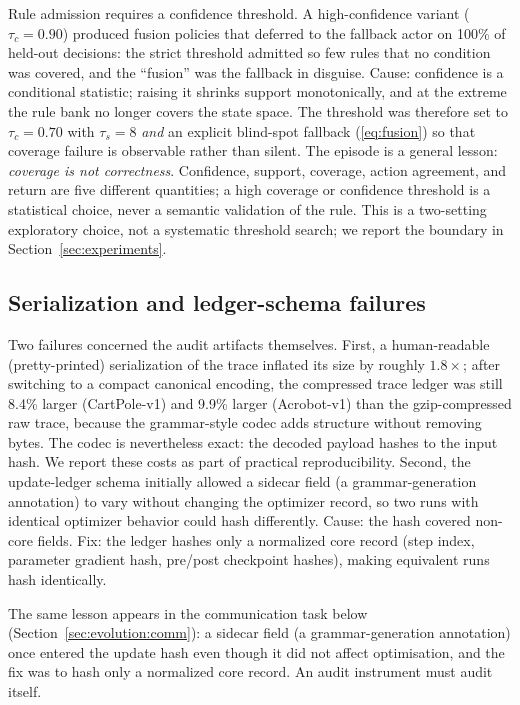 \documentclass[11pt]{article}
\begin{document}
Rule admission requires a confidence threshold. A high-confidence variant ($\tau_c=0.90$) produced
fusion policies that deferred to the fallback actor on 100\% of held-out decisions: the strict
threshold admitted so few rules that no condition was covered, and the ``fusion'' was the fallback
in disguise. Cause: confidence is a conditional statistic; raising it shrinks support monotonically,
and at the extreme the rule bank no longer covers the state space. The threshold was therefore set
to $\tau_c=0.70$ with $\tau_s=8$ \emph{and} an explicit blind-spot fallback (\ref{eq:fusion}) so
that coverage failure is observable rather than silent. The episode is a general lesson:
\emph{coverage is not correctness}. Confidence, support, coverage, action agreement, and return are
five different quantities; a high coverage or confidence threshold is a statistical choice, never a
semantic validation of the rule. This is a two-setting exploratory choice,
not a systematic threshold search; we report the boundary in
Section~\ref{sec:experiments}.

\subsection{Serialization and ledger-schema failures}
\label{sec:evolution:serialization}

Two failures concerned the audit artifacts themselves. First, a human-readable (pretty-printed)
serialization of the trace inflated its size by roughly $1.8\times$; after switching to a compact
canonical encoding, the compressed trace ledger was still 8.4\% larger (CartPole-v1) and 9.9\%
larger (Acrobot-v1) than the gzip-compressed raw trace, because the grammar-style codec adds
structure without removing bytes. The codec is nevertheless exact: the decoded payload hashes to the
input hash. We report these costs as part of practical reproducibility. Second, the update-ledger
schema initially allowed a sidecar field (a grammar-generation annotation) to vary without changing
the optimizer record, so two runs with identical optimizer behavior could hash differently.
Cause: the hash covered non-core fields. Fix: the ledger hashes only a normalized core record
(step index, parameter gradient hash, pre/post checkpoint hashes), making equivalent runs hash
identically.

The same lesson appears in the communication task below (Section~\ref{sec:evolution:comm}): a sidecar
field (a grammar-generation annotation) once entered the update hash even though it did not affect
optimisation, and the fix was to hash only a normalized core record. An audit instrument must audit
itself.
\end{document}
